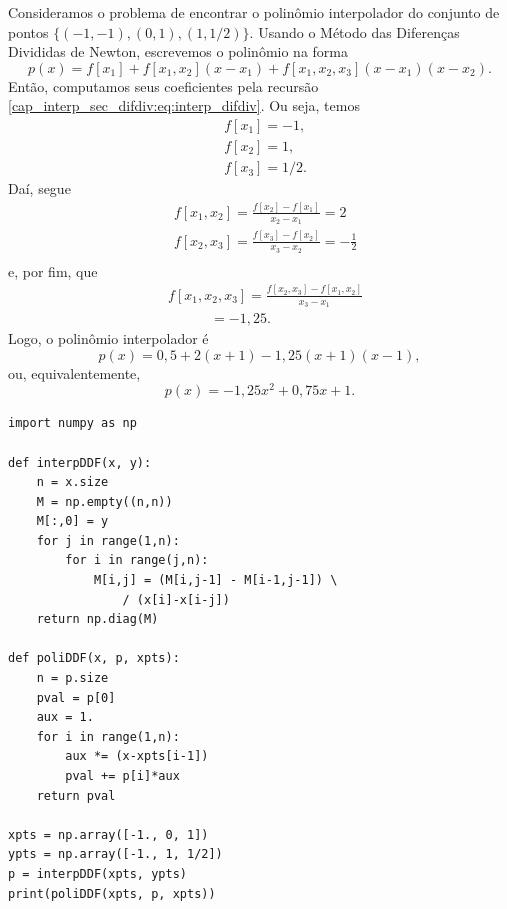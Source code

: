 \begin{ex}
  Consideramos o problema de encontrar o polinômio interpolador do conjunto de pontos $\{(-1, -1), (0, 1), (1, 1/2)\}$. Usando o Método das Diferenças Divididas de Newton, escrevemos o polinômio na forma
  \begin{equation}
    p(x) = f[x_1] + f[x_1,x_2](x-x_1) + f[x_1,x_2,x_3](x-x_1)(x-x_2).
  \end{equation}
  Então, computamos seus coeficientes pela recursão \eqref{cap_interp_sec_difdiv:eq:interp_difdiv}. Ou seja, temos
  \begin{subequations}
    \begin{align}
      &f[x_1] = -1,\\
      &f[x_2] = 1,\\
      &f[x_3] = 1/2.
  \end{align}
  \end{subequations}
  Daí, segue
  \begin{subequations}
    \begin{align}
      &f[x_1,x_2] = \frac{f[x_2]-f[x_1]}{x_2-x_1} = 2\\
      &f[x_2,x_3] = \frac{f[x_3]-f[x_2]}{x_3-x_2} = -\frac{1}{2}\\
    \end{align}
  \end{subequations}
  e, por fim, que
  \begin{subequations}
    \begin{align}
      &f[x_1,x_2,x_3] = \frac{f[x_2,x_3]-f[x_1,x_2]}{x_3-x_1}\\
      &\qquad\quad = -1,25.
    \end{align}
  \end{subequations}
  Logo, o polinômio interpolador é
  \begin{equation}
    p(x) = 0,5 + 2(x+1) - 1,25(x+1)(x-1),
  \end{equation}
  ou, equivalentemente,
  \begin{equation}
    p(x) = -1,25x^2 + 0,75x + 1.
  \end{equation}

\begin{lstlisting}
import numpy as np

def interpDDF(x, y):
    n = x.size
    M = np.empty((n,n))
    M[:,0] = y
    for j in range(1,n):
        for i in range(j,n):
            M[i,j] = (M[i,j-1] - M[i-1,j-1]) \
                / (x[i]-x[i-j])
    return np.diag(M)

def poliDDF(x, p, xpts):
    n = p.size
    pval = p[0]
    aux = 1.
    for i in range(1,n):
        aux *= (x-xpts[i-1])
        pval += p[i]*aux
    return pval

xpts = np.array([-1., 0, 1])
ypts = np.array([-1., 1, 1/2])
p = interpDDF(xpts, ypts)
print(poliDDF(xpts, p, xpts))
\end{lstlisting}
\end{ex}

